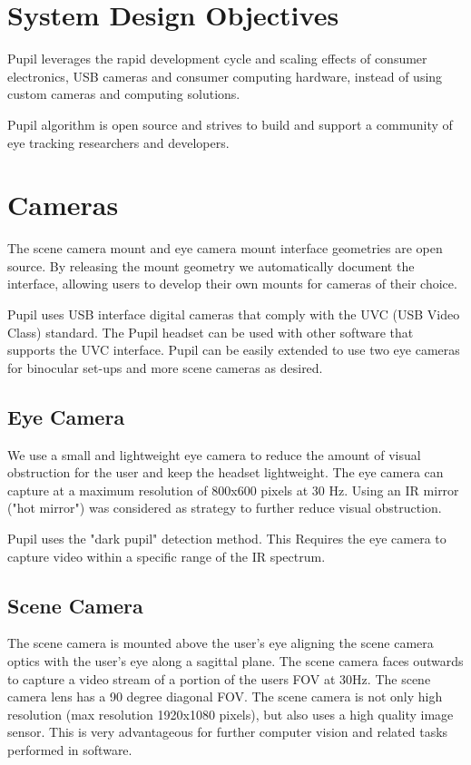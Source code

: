 \documentclass[12pt,fleqn]{book} %
\begin{document}
\section{System Design Objectives}
	Pupil leverages the rapid development cycle and scaling effects of consumer electronics, USB cameras and consumer computing hardware, instead of using custom cameras and computing solutions. \bigskip

Pupil algorithm is open source and strives to build and support a community of eye tracking researchers and developers.

\section{Cameras} 
The scene camera mount and eye camera mount interface geometries are open source. By releasing the mount geometry we automatically document the interface, allowing users to develop their own mounts for cameras of their choice. \bigskip

Pupil uses USB interface digital cameras that comply with the UVC (USB Video Class) standard. The Pupil headset can be used with other software that supports the UVC interface. Pupil can be easily extended to use two eye cameras for binocular set-ups and more scene cameras as desired. 

\subsection{Eye Camera} 
We use a small and lightweight eye camera to reduce the amount of visual obstruction for the user and keep the headset lightweight. The eye camera can capture at a maximum resolution of 800x600 pixels at 30 Hz. Using an IR mirror ("hot mirror") was considered as  strategy to further reduce visual obstruction. 

\bigskip
 Pupil uses the "dark pupil" detection method. This Requires the eye camera to capture video within a specific range of the IR spectrum. 
 
 \subsection{Scene Camera} 
  The scene camera is mounted above the user’s eye aligning the scene camera optics with the user’s eye along a sagittal plane. The scene camera faces outwards to capture a video stream of a portion of the users FOV at 30Hz. The scene camera lens has a 90 degree diagonal FOV. The scene camera is not only high resolution (max resolution 1920x1080 pixels), but also uses a high quality image sensor. This is very
advantageous for further computer vision and related tasks
performed in software.
\end{document}
